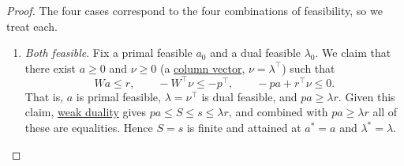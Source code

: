 	\begin{proof}
		The four cases correspond to the four combinations of feasibility, so we treat each. 

		\begin{enumerate}
			\item \textit{Both feasible}. Fix a primal feasible $a_0$ and a dual feasible $\lambda_0$. We claim that there exist $a \geq 0$ and $\nu \geq 0$ (a \hyperref[lin-def:column-vector]{column vector}, $\nu = \lambda^\top$) such that 
				\begin{equation}
					Wa \leq r, \qquad -W^\top \nu \leq -p^\top, \qquad -pa + r^\top \nu \leq 0.
				\end{equation}
				That is, $a$ is primal feasible, $\lambda = \nu^\top$ is dual feasible, and $pa \geq \lambda r$. Given this claim, \hyperref[thm:weak-duality]{weak duality} gives $pa \leq S \leq s \leq \lambda r$, and combined with $pa \geq \lambda r$ all of these are equalities. Hence $S = s$ is finite and attained at $a^\ast = a$ and $\lambda^\ast = \lambda$. 


\end{enumerate}
\end{proof}
